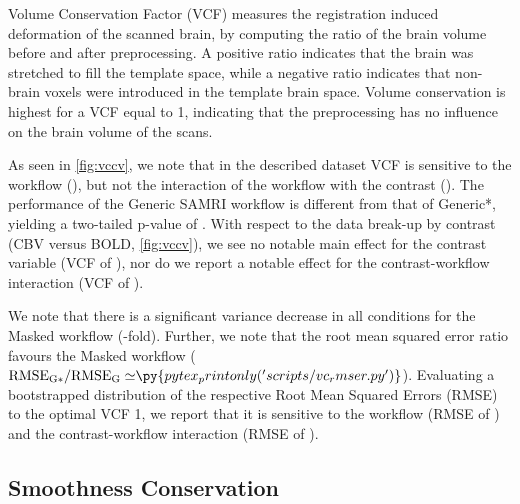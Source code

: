 Volume Conservation Factor (VCF) \cite{ioanas_optimized_2019} measures the registration induced deformation of the scanned brain, by computing the ratio of the brain volume before and after preprocessing.
A positive ratio indicates that the brain was stretched to fill the template space, while a negative ratio indicates that non-brain voxels were introduced in the template brain space.
Volume conservation is highest for a VCF equal to 1, indicating that the preprocessing has no influence on the brain volume of the scans.

As seen in \cref{fig:vccv}, we note that in the described dataset VCF is sensitive to the workflow
(),
but not the interaction of the workflow with the contrast ().
The performance of the Generic SAMRI workflow is different from that of Generic*, yielding a two-tailed p-value of .
With respect to the data break-up by contrast (CBV versus BOLD, \cref{fig:vccv}), we see no notable main effect for the contrast variable
(VCF of ), nor do we report a notable effect for the contrast-workflow interaction (VCF of ).

We note that there is a significant variance decrease in all conditions for the Masked workflow
(-fold).
Further, we note that the root mean squared error ratio favours the Masked workflow
($\mathrm{RMSE_{G*}/RMSE_{G}\simeq} \py{pytex_printonly('scripts/vc_rmser.py')}$).
Evaluating a bootstrapped distribution of the respective Root Mean Squared Errors (RMSE) to the optimal VCF 1, we report that it is sensitive to the
workflow (RMSE of )
and the contrast-workflow interaction (RMSE of ).

\subsection{Smoothness Conservation}

